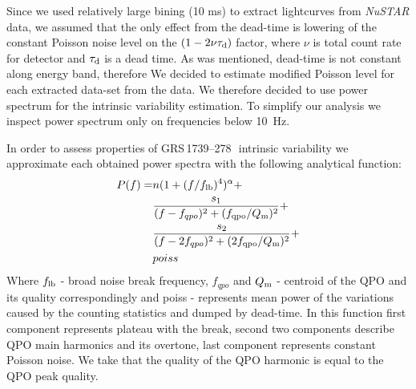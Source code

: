 \documentclass[a4paper,fleqn,usenatbib]{mnras}
\def\grs{{GRS\,1739--278\,}}
\begin{document}
Since we used relatively large bining (10 ms) to extract lightcurves from {\it NuSTAR} data, we assumed that the only effect from the dead-time is lowering of the constant Poisson noise level on the $(1 - 2\nu \tau_{\rm d})$ factor, where $\nu$ is total count rate for detector and $\tau_{\rm d}$ is a dead time. 
As was mentioned, dead-time is not constant along energy band, therefore We decided to estimate modified Poisson level for each extracted data-set from the data.
We therefore decided to use power spectrum for the intrinsic variability estimation.
To simplify our analysis we inspect power spectrum only on frequencies below 10~Hz.


In order to assess properties of \grs\ intrinsic variability we approximate each obtained power spectra with the following analytical function:
\begin{equation}
        \begin{aligned}
                P(f)  = & n (1 + (f/f_{\rm lb})^4)^{\alpha} + \\
                     &\frac{s_1}{(f - f_{qpo})^2 + (f_{\rm qpo}/Q_{\rm m})^2} +\\
                        & \frac{s_2}{(f - 2f_{qpo})^2 + (2f_{\rm qpo}/Q_{\rm m})^2} + \\
                        & poiss
\end{aligned}
        \label{eq:complex_fit}
\end{equation}
Where $f_{\rm lb}$ - broad noise break frequency, $f_{qpo}$ and $Q_{\rm m}$ - centroid of the QPO and its quality correspondingly and poiss - represents mean power of the variations caused by the counting statistics and dumped by dead-time.
In this function first component represents plateau with the break, second two components describe QPO main harmonics and its overtone, last component represents constant Poisson noise.
We take that the quality of the QPO harmonic is equal to the QPO peak quality.
\end{document}
